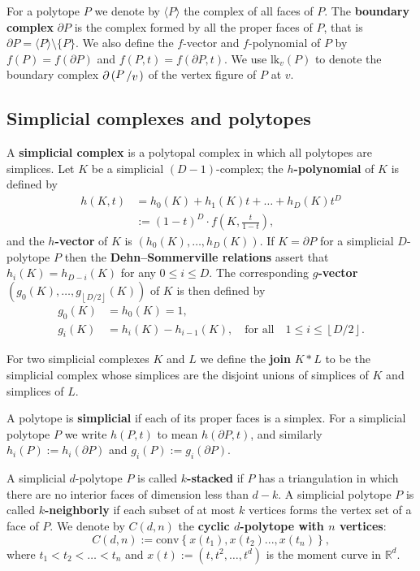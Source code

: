 \documentclass[a4paper,leqno]{article}
\theoremstyle{definition}
\newcommand{\lk}{\mathrm{lk}}
\newcommand{\conv}{\mathrm{conv}}
\newcommand{\dhalf}[1]{\left\lfloor #1/2\right\rfloor}
\newcommand{\R}{\mathbb{R}}
\newcommand{\vfig}[2]{{\raisebox{.1em}{$#1$}\left/\raisebox{-.1em}{$#2$}\right.}}
\begin{document}
For a polytope $P$ we denote by $\langle P\rangle$ the complex of all faces of $P$. The {\bf boundary complex} $\partial P$ is the complex formed by all the proper faces of $P$, that is $\partial P=\langle P\rangle\setminus \{P\}$. We also define the $f$-vector and $f$-polynomial of $P$ by $f(P) = f(\partial P)$ and $f(P,t) = f(\partial P,t)$.
We use $\lk_v(P)$ to denote the boundary complex $\partial \left(\vfig{P}{v}\right)$ of the vertex figure of $P$ at $v$.


\subsection{Simplicial complexes and polytopes}

A {\bf simplicial complex} is a polytopal complex in which all polytopes are simplices. Let $K$ be a simplicial $(D-1)$-complex; the {\bf $h$-polynomial} of $K$ is defined by
\begin{equation*}
\begin{aligned}
h(K,t)
&=h_0(K)+h_1(K)t+\dots +h_D(K)t^D \\
&:=(1-t)^D\cdot f\left(K,\frac{t}{1-t}\right),
\end{aligned}
\end{equation*}
and the {\bf $h$-vector} of $K$ is $(h_0(K),\dots ,h_D(K))$. If $K=\partial P$ for a simplicial $D$-polytope $P$ then the {\bf Dehn--Sommerville relations} assert that $h_i(K)=h_{D-i}(K)$ for any $0\le i\le D$.
The corresponding {\bf $g$-vector} $\left(g_0(K),\dots ,g_{\dhalf{D}}(K)\right)$ of $K$ is then defined by
\begin{equation*}
\begin{aligned}
g_0(K)&= h_0(K) = 1,\\
g_i(K)&=h_i(K)-h_{i-1}(K),\quad\text{for all}\quad 1\leq i\leq\dhalf{D}.
\end{aligned}
\end{equation*}

For two simplicial complexes $K$ and $L$ we define the {\bf join} $K\ast L$ to be the simplicial complex whose simplices are the disjoint unions of simplices of $K$ and simplices of $L$.

A polytope is {\bf simplicial} if each of its proper faces is a simplex.
For a simplicial polytope $P$ we write $h(P,t)$ to mean $h(\partial P,t)$, and similarly $h_i(P):=h_i(\partial P)$ and $g_i(P):=g_i(\partial P)$.

A simplicial $d$-polytope $P$ is called {\bf $k$-stacked} if $P$ has a triangulation in which there are no interior faces of dimension less than $d-k$. A simplicial polytope $P$ is called {\bf $k$-neighborly} if each subset of at most $k$ vertices forms the vertex set of a face of $P$. We denote by $C(d,n)$ the {\bf cyclic $d$-polytope with $n$ vertices}:
$$C(d,n) := \conv\left\{x(t_1), x(t_2). . . , x(t_n)\right\},$$
where $t_1 < t_2 <\dots < t_n$ and $x(t) := \left(t,t^2,\dots ,t^d\right)$ is the moment curve in $\R^d$.
\end{document}

